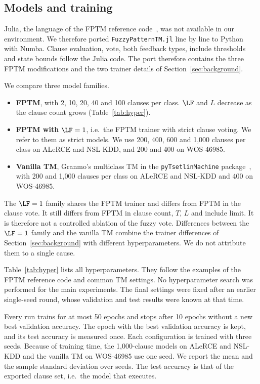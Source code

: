 \subsection{Models and training}
Julia, the language of the FPTM reference code~\cite{hnilov2025code}, was not available in our environment.
We therefore ported \texttt{FuzzyPatternTM.jl} line by line to Python with Numba.
Clause evaluation, vote, both feedback types, include thresholds and state bounds follow the Julia code.
The port therefore contains the three FPTM modifications and the two trainer details of Section~\ref{sec:background}.


We compare three model families.
\begin{itemize}
\item \textbf{FPTM}, with 2, 10, 20, 40 and 100 clauses per class.
$\LF$ and $L$ decrease as the clause count grows (Table~\ref{tab:hyper}).
\item \textbf{FPTM with $\LF=1$}, i.e.\ the FPTM trainer with strict clause voting. We refer to them as strict models.
We use 200, 400, 600 and 1,000 clauses per class on ALeRCE and NSL-KDD, and 200 and 400 on WOS-46985.
\item \textbf{Vanilla TM}, Granmo's multiclass TM in the \texttt{pyTsetlinMachine} package~\cite{pytsetlin}, with 200 and 1,000 clauses per class on ALeRCE and NSL-KDD and 400 on WOS-46985.

\end{itemize}
The $\LF=1$ family shares the FPTM trainer and differs from FPTM in the clause vote.
It still differs from FPTM in clause count, $T$, $L$ and include limit. It is therefore not a controlled ablation of the fuzzy vote.
Differences between the $\LF=1$ family and the vanilla TM combine the trainer differences of Section~\ref{sec:background} with different hyperparameters. We do not attribute them to a single cause.

Table~\ref{tab:hyper} lists all hyperparameters.
They follow the examples of the FPTM reference code and common TM settings. No hyperparameter search was performed for the main experiments. The final settings were fixed after an earlier single-seed round, whose validation and test results were known at that time. 

Every run trains for at most 50 epochs and stops after 10 epochs without a new best validation accuracy.
The epoch with the best validation accuracy is kept, and its test accuracy is measured once.
Each configuration is trained with three seeds.
Because of training time, the 1,000-clause models on ALeRCE and NSL-KDD and the vanilla TM on WOS-46985 use one seed.
We report the mean and the sample standard deviation over seeds.
The test accuracy is that of the exported clause set, i.e.\ the model that \gainp{} executes.

